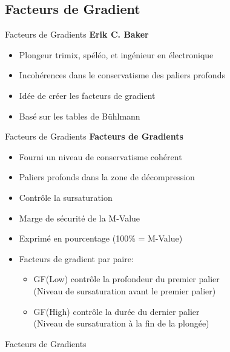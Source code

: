 \subsection{Facteurs de Gradient}

\begin{frame}{Facteurs de Gradients}  
	\textbf{Erik  C. Baker}
	\begin{itemize}
		\item Plongeur trimix, spéléo, et ingénieur en électronique
		\item Incohérences dans le conservatisme des paliers profonds
		\item Idée de créer les facteurs de gradient
		\item Basé sur les tables de Bühlmann
	\end{itemize}
\end{frame}

\begin{frame}{Facteurs de Gradients}  
	\textbf{Facteurs de Gradients}
	\begin{itemize}
		\item Fourni un niveau de conservatisme cohérent
		\item Paliers profonds dans la zone de décompression
		\item Contrôle la sursaturation
		\item Marge de sécurité de la M-Value
		\item Exprimé en pourcentage (100\% = M-Value)
		\item Facteurs de gradient par paire:
		\begin{itemize}
			\item GF(Low) contrôle la profondeur du premier palier\\(Niveau de sursaturation avant le premier palier)
			\item GF(High) contrôle la durée du dernier palier\\(Niveau de sursaturation à la fin de la plongée)
		\end{itemize}
	\end{itemize}
\end{frame}

\begin{frame}{Facteurs de Gradients}  
\end{frame}

